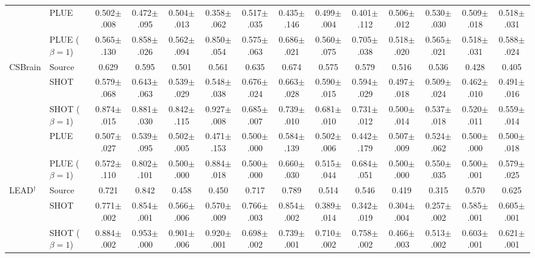 \documentclass[letterpaper]{article} %
\begin{document}
\begin{table}[!t]
\begin{tabular}{ll cc cc cc cc cc cc}
     & PLUE & 0.502{$\pm$.008} & 0.472{$\pm$.095} & 0.504{$\pm$.013} & 0.358{$\pm$.062} & 0.517{$\pm$.035} & 0.435{$\pm$.146} & 0.499{$\pm$.004} & 0.401{$\pm$.112} & 0.506{$\pm$.012} & 0.530{$\pm$.030} & 0.509{$\pm$.018} & 0.518{$\pm$.031} \\
     & PLUE ($\beta{=}1$) & 0.565{$\pm$.130} & 0.858{$\pm$.026} & 0.562{$\pm$.094} & 0.850{$\pm$.054} & 0.575{$\pm$.063} & 0.686{$\pm$.021} & 0.560{$\pm$.075} & 0.705{$\pm$.038} & 0.518{$\pm$.020} & 0.565{$\pm$.021} & 0.518{$\pm$.031} & 0.588{$\pm$.024} \\
    \midrule
    CSBrain & Source & 0.629 & 0.595 & 0.501 & 0.561 & 0.635 & 0.674 & 0.575 & 0.579 & 0.516 & 0.536 & 0.428 & 0.405 \\
     & SHOT & 0.579{$\pm$.068} & 0.643{$\pm$.063} & 0.539{$\pm$.029} & 0.548{$\pm$.038} & 0.676{$\pm$.024} & 0.663{$\pm$.028} & 0.590{$\pm$.015} & 0.594{$\pm$.029} & 0.497{$\pm$.018} & 0.509{$\pm$.024} & 0.462{$\pm$.010} & 0.491{$\pm$.016} \\
     & SHOT ($\beta{=}1$) & 0.874{$\pm$.015} & 0.881{$\pm$.030} & 0.842{$\pm$.115} & 0.927{$\pm$.008} & 0.685{$\pm$.007} & 0.739{$\pm$.010} & 0.681{$\pm$.010} & 0.731{$\pm$.012} & 0.500{$\pm$.014} & 0.537{$\pm$.018} & 0.520{$\pm$.011} & 0.559{$\pm$.014} \\
     & PLUE & 0.507{$\pm$.027} & 0.539{$\pm$.095} & 0.502{$\pm$.005} & 0.471{$\pm$.153} & 0.500{$\pm$.000} & 0.584{$\pm$.139} & 0.502{$\pm$.006} & 0.442{$\pm$.179} & 0.507{$\pm$.009} & 0.524{$\pm$.062} & 0.500{$\pm$.000} & 0.500{$\pm$.018} \\
     & PLUE ($\beta{=}1$) & 0.572{$\pm$.110} & 0.802{$\pm$.101} & 0.500{$\pm$.000} & 0.884{$\pm$.018} & 0.500{$\pm$.000} & 0.660{$\pm$.030} & 0.515{$\pm$.044} & 0.684{$\pm$.051} & 0.500{$\pm$.000} & 0.550{$\pm$.035} & 0.500{$\pm$.001} & 0.579{$\pm$.025} \\
    \midrule
    LEAD$^\dagger$ & Source & 0.721 & 0.842 & 0.458 & 0.450 & 0.717 & 0.789 & 0.514 & 0.546 & 0.419 & 0.315 & 0.570 & 0.625 \\
     & SHOT & 0.771{$\pm$.002} & 0.854{$\pm$.001} & 0.566{$\pm$.006} & 0.570{$\pm$.009} & 0.766{$\pm$.003} & 0.854{$\pm$.002} & 0.389{$\pm$.014} & 0.342{$\pm$.019} & 0.304{$\pm$.004} & 0.257{$\pm$.002} & 0.585{$\pm$.001} & 0.605{$\pm$.001} \\
     & SHOT ($\beta{=}1$) & 0.884{$\pm$.002} & 0.953{$\pm$.000} & 0.901{$\pm$.006} & 0.920{$\pm$.001} & 0.698{$\pm$.002} & 0.739{$\pm$.001} & 0.710{$\pm$.002} & 0.758{$\pm$.002} & 0.466{$\pm$.003} & 0.513{$\pm$.002} & 0.603{$\pm$.001} & 0.621{$\pm$.001} \\

\end{tabular}
\end{table}
\end{document}
